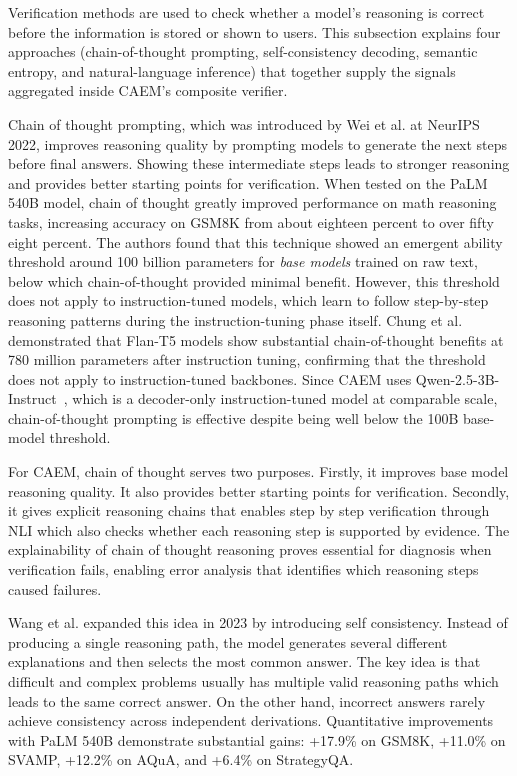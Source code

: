 Verification methods are used to check whether a model's reasoning is correct before the information is stored or shown to users. This subsection explains four approaches (chain-of-thought prompting, self-consistency decoding, semantic entropy, and natural-language inference) that together supply the signals aggregated inside CAEM's composite verifier.

Chain of thought prompting, which was introduced by Wei et al. \cite{NEURIPS2022_9d560961} at NeurIPS 2022, improves reasoning quality by prompting models to generate the next steps before final answers. Showing these intermediate steps leads to stronger reasoning and provides better starting points for verification. When tested on the PaLM 540B model, chain of thought greatly improved performance on math reasoning tasks, increasing accuracy on GSM8K from about eighteen percent to over fifty eight percent. The authors found that this technique showed an emergent ability threshold around 100 billion parameters for \textit{base models} trained on raw text, below which chain-of-thought provided minimal benefit. However, this threshold does not apply to instruction-tuned models, which learn to follow step-by-step reasoning patterns during the instruction-tuning phase itself. Chung et al.\ \cite{JMLR:v25:23-0870} demonstrated that Flan-T5 models show substantial chain-of-thought benefits at 780 million parameters after instruction tuning, confirming that the threshold does not apply to instruction-tuned backbones. Since CAEM uses Qwen-2.5-3B-Instruct~\cite{qwen25}, which is a decoder-only instruction-tuned model at comparable scale, chain-of-thought prompting is effective despite being well below the 100B base-model threshold.

For CAEM, chain of thought serves two purposes. Firstly, it improves base model reasoning quality. It also provides better starting points for verification. Secondly, it gives explicit reasoning chains that enables step by step verification through NLI which also checks whether each reasoning step is supported by evidence. The explainability of chain of thought reasoning proves essential for diagnosis when verification fails, enabling error analysis that identifies which reasoning steps caused failures.

Wang et al. \cite{wang2023selfconsistency} expanded this idea in 2023 by introducing self consistency. Instead of producing a single reasoning path, the model generates several different explanations and then selects the most common answer. The key idea is that difficult and complex problems usually has multiple valid reasoning paths which leads to the same correct answer. On the other hand, incorrect answers rarely achieve consistency across independent derivations. Quantitative improvements with PaLM 540B demonstrate substantial gains: +17.9\% on GSM8K, +11.0\% on SVAMP, +12.2\% on AQuA, and +6.4\% on StrategyQA.

